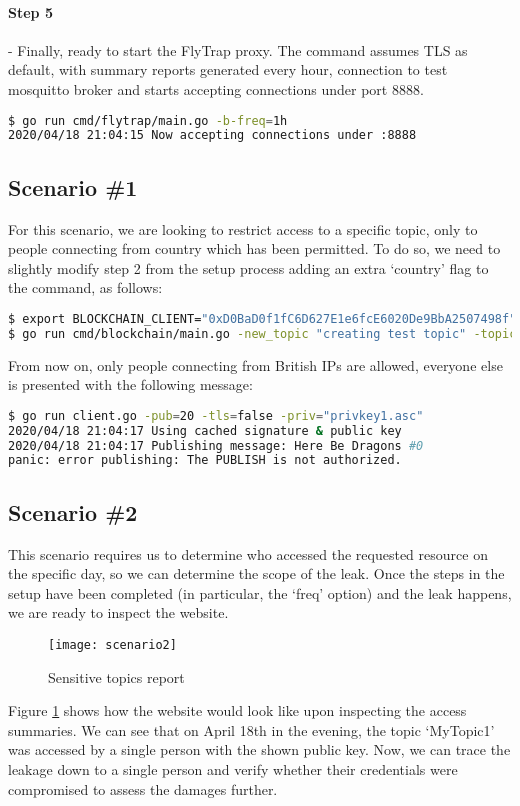 \paragraph{Step 5} - Finally, ready to start the FlyTrap proxy. The command assumes TLS as default, with summary reports generated every hour, connection to test mosquitto broker and starts accepting connections under port 8888.
\begin{lstlisting}[language=bash,breaklines=true]
$ go run cmd/flytrap/main.go -b-freq=1h
2020/04/18 21:04:15 Now accepting connections under :8888
\end{lstlisting}
\subsection{Scenario \#1}
For this scenario, we are looking to restrict access to a specific topic, only to people connecting from country which has been permitted. To do so, we need to slightly modify step 2 from the setup process adding an extra `country' flag to the command, as follows:
\begin{lstlisting}[language=bash,breaklines=true]
$ export BLOCKCHAIN_CLIENT="0xD0BaD0f1fC6D627E1e6fcE6020De9BbA2507498f"
$ go run cmd/blockchain/main.go -new_topic "creating test topic" -topic "RestrictedTopic" -country="GB"
\end{lstlisting}
From now on, only people connecting from British IPs are allowed, everyone else is presented with the following message:
\begin{lstlisting}[language=bash,breaklines=true]
$ go run client.go -pub=20 -tls=false -priv="privkey1.asc"
2020/04/18 21:04:17 Using cached signature & public key
2020/04/18 21:04:17 Publishing message: Here Be Dragons #0
panic: error publishing: The PUBLISH is not authorized.
\end{lstlisting}
\subsection{Scenario \#2}
This scenario requires us to determine who accessed the requested resource on the specific day, so we can determine the scope of the leak. Once the steps in the setup have been completed (in particular, the `freq' option) and the leak happens, we are ready to inspect the website.

\begin{figure}[h]
    \centering
    \texttt{[image: scenario2]}
    \caption{Sensitive topics report}
    \label{fig:scenario2}
\end{figure}
Figure \ref{fig:scenario2} shows how the website would look like upon inspecting the access summaries. We can see that on April 18th in the evening, the topic `MyTopic1' was accessed by a single person with the shown public key. Now, we can trace the leakage down to a single person and verify whether their credentials were compromised to assess the damages further.

